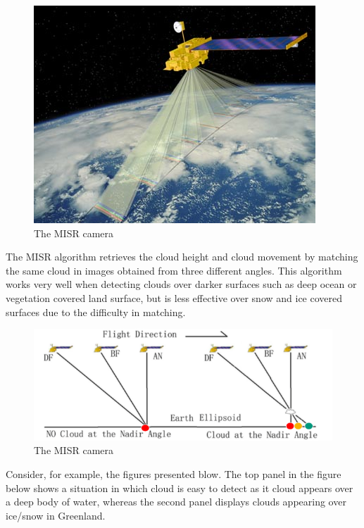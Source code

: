 \begin{figure}[H]
\begin{center}
\includegraphics[scale=0.4]{misr.jpg}
\end{center}
\caption{The MISR camera}
\label{fig:misr}
\end{figure}


The MISR algorithm retrieves the cloud height and cloud movement by matching the same cloud in images obtained from three different angles. This algorithm works very well when detecting clouds over darker surfaces such as deep ocean or vegetation covered land surface, but is less effective over snow and ice covered surfaces due to the difficulty in matching.

\begin{figure}[H]
\begin{center}
\includegraphics[scale=0.4]{misr_detect.png}
\end{center}
\caption{The MISR camera}
\label{fig:misr2}
\end{figure}

Consider, for example, the figures presented blow. The top panel in the figure below shows a situation in which cloud is easy to detect as it cloud appears over a deep body of water, whereas the second panel displays clouds appearing over ice/snow in Greenland.


